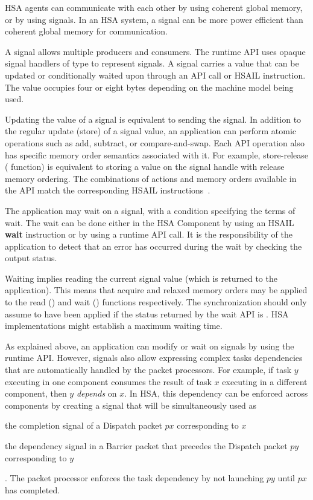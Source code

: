 \documentclass[final]{book}
\newcommand{\reffun}[1]{\textbf{#1}}
\newcommand{\refhsl}[1]{\reffun{#1}}
\begin{document}
HSA agents can communicate with each other by using coherent global 
memory, or by using signals. In an HSA system, a signal can be more power 
efficient than coherent global memory for communication. 

A signal allows multiple producers and consumers. The runtime API uses opaque 
signal handlers of type  to represent signals. A 
signal carries a value that can be updated or conditionally waited upon through 
an API call or HSAIL instruction. The value occupies four or eight bytes 
depending on the machine model being used.

Updating the value of a signal is equivalent to sending the signal. In addition
to the regular update (store) of a signal value, an application can perform atomic
operations such as add, subtract, or compare-and-swap. Each API operation also
has specific memory order semantics associated with it. For example,
store-release ( function) is equivalent to
storing a value on the signal handle with release memory ordering. The
combinations of actions and memory orders available in the API match the
corresponding HSAIL instructions~\cite{prm}.

The application may wait on a signal, with a condition specifying the terms of
wait. The wait can be done either in the HSA Component by using an HSAIL
\refhsl{wait} instruction or by using a runtime API call. It is the 
responsibility of the application to detect that an error has occurred during 
the wait by checking the output status.

Waiting implies reading the current signal value (which is returned to the
application). This means that acquire and relaxed memory orders may be applied 
to the read () and wait 
() functions respectively. The synchronization 
should only assume to have been applied if the status returned by the wait 
API is . HSA implementations might establish a 
maximum waiting time.

As explained above, an application can modify or wait on signals by using
the runtime API. However, signals also allow expressing complex tasks
dependencies that are automatically handled by the packet processors. For
example, if task $y$ executing in one component consumes the result of task $x$
executing in a different component, then $y$ \textit{depends} on $x$. In HSA,
this dependency can be enforced across components by creating a signal that will
be simultaneously used as \begin{inparaenum}[a\upshape)] \item the completion
signal of a Dispatch packet $px$ corresponding to $x$ \item the dependency
signal in a Barrier packet that precedes the Dispatch packet $py$
corresponding to $y$\end{inparaenum}. The packet processor enforces the
task dependency by not launching $py$ until $px$ has completed.
\end{document}
